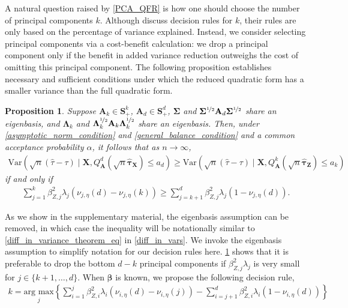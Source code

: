 \documentclass[11pt,twoside]{article}
\newtheorem{proposition}{Proposition}
\theoremstyle{definition}
\theoremstyle{remark}
\begin{document}
A natural question raised by \cref{PCA_QFR} is how one should choose the number of principal components $k$. Although \cite{zhang2023pca} discuss decision rules for $k$, their rules are only based on the percentage of variance explained. Instead, we consider selecting principal components via a cost-benefit calculation: we drop a principal component only if the benefit in added variance reduction outweighs the cost of omitting this principal component. The following proposition establishes necessary and sufficient conditions under which the reduced quadratic form has a smaller variance than the full quadratic form.
\begin{proposition} \label{drop_pcs}
    Suppose $\mathbf{A}_k \in \mathbf{S}^k_+$, $\mathbf{A}_d \in \mathbf{S}^d_+$, $\mathbf{\Sigma}$ and $\mathbf{\Sigma}^{\nicefrac{1}{2}} \mathbf{A}_d \mathbf{\Sigma}^{\nicefrac{1}{2}}$ share an eigenbasis, and $\mathbf{\Lambda}_k$ and $\mathbf{\Lambda}_k^{\nicefrac{1}{2}} \mathbf{A}_k \mathbf{\Lambda}_k^{\nicefrac{1}{2}}$ share an eigenbasis. Then, under \cref{asymptotic_norm_condition} and \cref{general_balance_condition} and a common acceptance probability $\alpha$, it follows that as $n \to \infty$,
    \begin{align*}
        \text{Var}(\sqrt{n}(\widehat{\tau} - \tau) \mid \mathbf{X}, Q^d_\mathbf{A}(\sqrt{n} \widehat{\bm{\tau}}_{\mathbf{X}}) \leq a_d) \geq \text{Var}(\sqrt{n}(\widehat{\tau} - \tau) \mid \mathbf{X}, Q^k_\mathbf{A}(\sqrt{n} \widehat{\bm{\tau}}_{\mathbf{Z}}) \leq a_k)
    \end{align*}
    if and only if
    \begin{align*}
    \sum^k_{j=1} \beta^2_{Z, j} \lambda_j (\nu_{j, \eta}(d) - \nu_{j, \eta}(k)) \geq \sum^d_{j=k+1} \beta^2_{Z, j} \lambda_j (1 - \nu_{j, \eta}(d)).
\end{align*}
\end{proposition}
As we show in the supplementary material, the eigenbasis assumption can be removed, in which case the inequality will be notationally similar to \cref{diff_in_variance_theorem_eq} in \cref{diff_in_vars}. We invoke the eigenbasis assumption to simplify notation for our decision rules here. \cref{drop_pcs} shows that it is preferable to drop the bottom $d - k$ principal components if $\beta^2_{Z, j} \lambda_j$ is very small for $j \in \{k+1, \ldots, d\}$. When $\bm{\beta}$ is known, we propose the following decision rule,
\begin{align} \label{sb_rule_beta_known}
   k = \underset{j}{\text{arg max}} \left\{  \sum^j_{i=1}\beta^2_{Z, i} \lambda_i (\nu_{i, \eta}(d) - \nu_{i, \eta}(j)) - \sum^d_{i=j+1} \beta^2_{Z, i}\lambda_i (1 - \nu_{i, \eta}(d))\right\}
\end{align}
\end{document}
